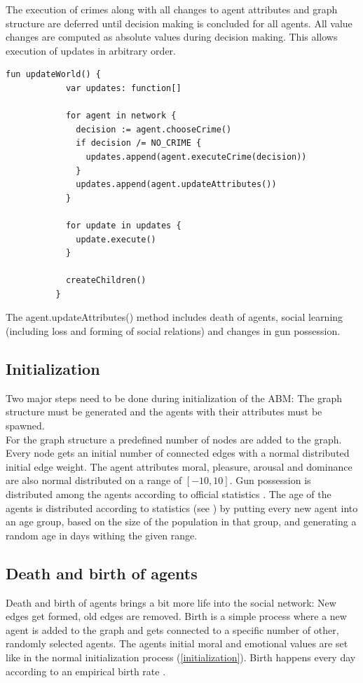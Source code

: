 \documentclass{JASSS}
\begin{document}
		The execution of crimes along with all changes to agent attributes and graph structure are
		deferred until decision making is concluded for all agents. All value changes are computed
		as absolute values during decision making. This allows execution of updates in arbitrary
		order.

		\begin{lstlisting}[caption=The daily global update routine, label=l_global_update]
          fun updateWorld() {
            var updates: function[]

            for agent in network {
              decision := agent.chooseCrime()
              if decision /= NO_CRIME {
                updates.append(agent.executeCrime(decision))
              }
              updates.append(agent.updateAttributes())
            }

            for update in updates {
              update.execute()
            }

            createChildren()
          }
		\end{lstlisting}
   		The agent.updateAttributes() method includes death of agents, social learning (including loss and forming of social relations) and changes in gun possession.

    \subsection{Initialization}

    Two major steps need to be done during initialization of the ABM:
    The graph structure must be generated and the agents with their attributes must be spawned.\\
    For the graph structure a predefined number of nodes are added to the graph.
    Every node gets an initial number of connected edges with a normal distributed initial edge weight.
    The agent attributes moral, pleasure, arousal and dominance are also normal distributed on a range of $[-10, 10]$.
    Gun possession is distributed among the agents according to official statistics \citep{gunpos}.
	The age of the agents is distributed according to statistics (see \citet{agedist}) by putting
	every new agent into an age group, based on the size of the population in that group, and
	generating a random age in days withing the given range. \label{initialization}

    \subsection{Death and birth of agents}
    Death and birth of agents brings a bit more life into the social network: New edges get formed, old edges are removed.
    Birth is a simple process where a new agent is added to the graph and gets connected to a specific number of other, randomly selected agents.
    The agents initial moral and emotional values are set like in the normal initialization process (\ref{initialization}).
    Birth happens every day according to an empirical birth rate \citep{birthrate}.
\end{document}
